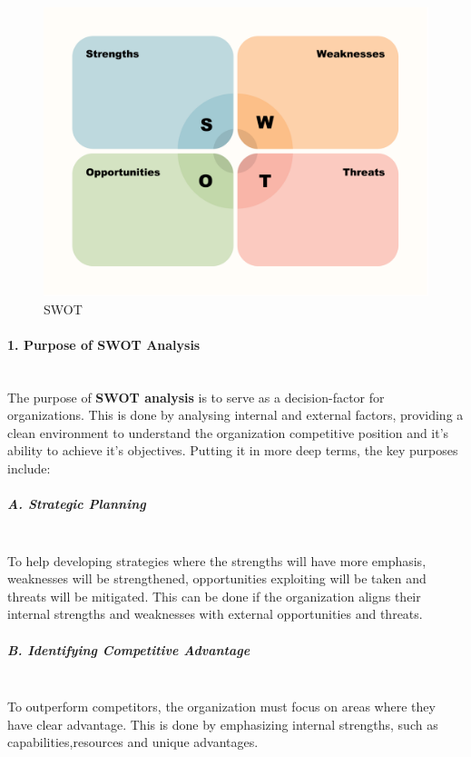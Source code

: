 \begin{figure}[H]
    \centering
    \includegraphics[width=1\textwidth]{assets/swot/SWOT.png} %
    \caption{SWOT}
    \label{fig:sample-image} 
\end{figure}

\paragraph{1. Purpose of SWOT Analysis}\mbox{}\\
The purpose of \textbf{SWOT analysis} is to serve as a decision-factor for organizations. This is done by analysing internal and external factors, providing a clean environment to understand the organization competitive position and it's ability to achieve it's objectives. Putting it in more deep terms, the key purposes include:

\subparagraph{A. Strategic Planning}\mbox{}\\
To help developing strategies where the strengths will have more emphasis, weaknesses will be strengthened, opportunities exploiting will be taken and threats will be mitigated. This can be done if the organization aligns their internal strengths and weaknesses with external opportunities and threats.

\subparagraph{B. Identifying Competitive Advantage}\mbox{}\\
To outperform competitors, the organization must focus on areas where they have clear advantage. This is done by emphasizing internal strengths, such as capabilities,resources and unique advantages.

